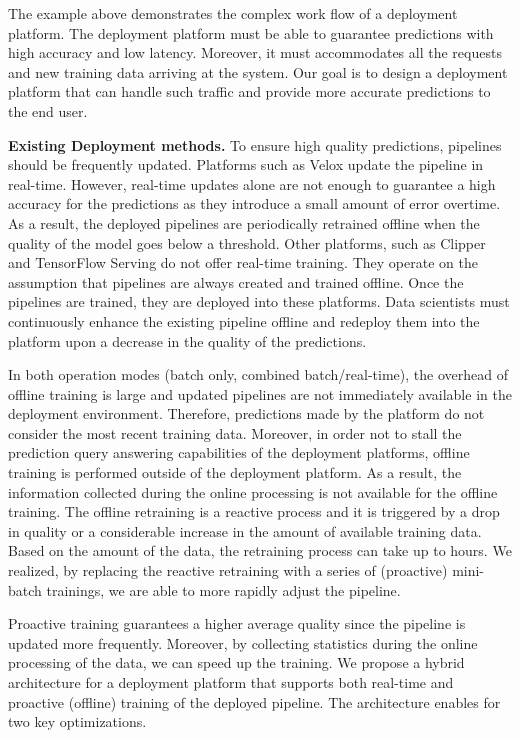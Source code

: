 The example above demonstrates the complex work flow of a deployment platform.
The deployment platform must be able to guarantee predictions with high accuracy and low latency.
Moreover, it must accommodates all the requests and new training data arriving at the system. 
Our goal is to design a deployment platform that can handle such traffic and provide more accurate predictions to the end user.

\textbf{Existing Deployment methods.} 
To ensure high quality predictions, pipelines should be frequently updated.
Platforms such as Velox update the pipeline in real-time.
However, real-time updates alone are not enough to guarantee a high accuracy for the predictions as they introduce a small amount of error overtime\cite{crankshaw2014missing}.
As a result, the deployed pipelines are periodically retrained offline when the quality of the model goes below a threshold.
Other platforms, such as Clipper and TensorFlow Serving do not offer real-time training.
They operate on the assumption that pipelines are always created and trained offline.
Once the pipelines are trained, they are deployed into these platforms.
Data scientists must continuously enhance the existing pipeline offline and redeploy them into the platform upon a decrease in the quality of the predictions.

In both operation modes (batch only, combined batch/real-time), the overhead of offline training is large and updated pipelines are not immediately available in the deployment environment.
Therefore, predictions made by the platform do not consider the most recent training data.
Moreover, in order not to stall the prediction query answering capabilities of the deployment platforms, offline training is performed outside of the deployment platform.
As a result, the information collected during the online processing is not available for the offline training. 
The offline retraining is a reactive process and it is triggered by a drop in quality or a considerable increase in the amount of available training data.
Based on the amount of the data, the retraining process can take up to hours.
We realized, by replacing the reactive retraining with a series of (proactive) mini-batch trainings, we are able to more rapidly adjust the pipeline.

Proactive training guarantees a higher average quality since the pipeline is updated more frequently.
Moreover, by collecting statistics during the online processing of the data, we can speed up the training.
We propose a hybrid architecture for a deployment platform that supports both real-time and proactive (offline) training of the deployed pipeline.
The architecture enables for two key optimizations.

